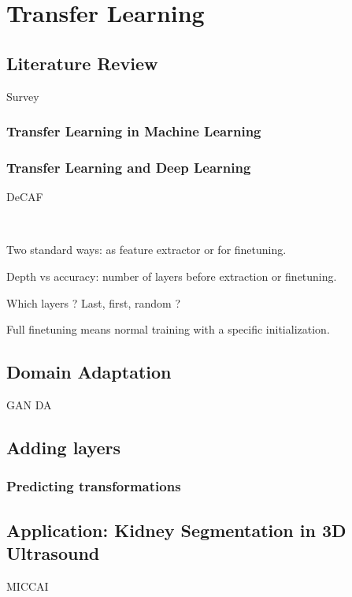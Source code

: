 \chapter{Transfer Learning}
\label{chap:transfer}

\minitoc

\newpage

\section{Literature Review}

Survey~\textcite{pan2010TNDE}

\subsection{Transfer Learning in Machine Learning}



\subsection{Transfer Learning and Deep Learning}

DeCAF~\textcite{donahue14PMLR}

~\textcite{yosinski2014NIPS}

Two standard ways: as feature extractor or for finetuning.

Depth vs accuracy: number of layers before extraction or finetuning.

Which layers ? Last, first, random ?

Full finetuning means normal training with a specific initialization.



\section{Domain Adaptation}

GAN DA~\textcite{kamnitsas2017IPMI}

\section{Adding layers}

\subsection{Predicting transformations}

\section{Application: Kidney Segmentation in 3D Ultrasound}

MICCAI

